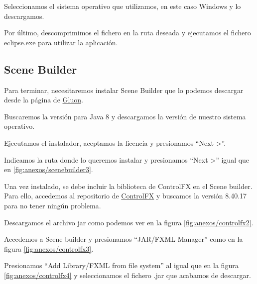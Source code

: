 Seleccionamos el sistema operativo que utilizamos, en este caso Windows y lo descargamos.


Por último, descomprimimos el fichero en la ruta deseada y ejecutamos el fichero eclipse.exe para utilizar la aplicación.

\subsection{Scene Builder}

Para terminar, necesitaremos instalar Scene Builder que lo podemos descargar desde la página de \href{https://gluonhq.com/products/scene-builder/}{Gluon}.

Buscaremos la versión para Java 8 y descargamos la versión de nuestro sistema operativo.


Ejecutamos el instalador, aceptamos la licencia y presionamos ``Next >''.


Indicamos la ruta donde lo queremos instalar y presionamos ``Next >'' igual que en \ref{fig:anexos/scenebuilder3}.


Una vez instalado, se debe incluir la biblioteca de ControlFX en el Scene builder. Para ello, accedemos al repositorio de \href{https://mvnrepository.com/artifact/org.controlsfx/controlsfx}{ControlFX} y buscamos la versión 8.40.17 para no tener ningún problema.


Descargamos el archivo jar como podemos ver en la figura \ref{fig:anexos/controlfx2}.


Accedemos a Scene builder y presionamos ``JAR/FXML Manager'' como en la figura \ref{fig:anexos/controlfx3}.


Presionamos ``Add Library/FXML from file system'' al igual que en la figura \ref{fig:anexos/controlfx4} y seleccionamos el fichero .jar que acabamos de descargar.


